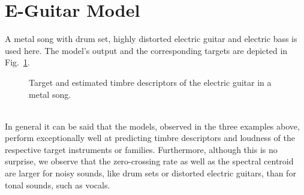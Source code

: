 \section*{E-Guitar Model}
A metal song with drum set, highly distorted electric guitar and electric bass is used here. The model's output and the corresponding targets are depicted in Fig.~\ref{fig:e-guitar-model}.
\begin{figure}
	\captionsetup{list=no}
	\centering
	\caption{Target and estimated timbre descriptors of the electric guitar in a metal song.}\label{fig:e-guitar-model}
\end{figure}\\

In general it can be said that the models, observed in the three examples above, perform exceptionally well at predicting timbre descriptors and loudness of the respective target instruments or families. Furthermore, although this is no surprise, we observe that the zero-crossing rate as well as the spectral centroid are larger for noisy sounds, like drum sets or distorted electric guitars, than for tonal sounds, such as vocals.





